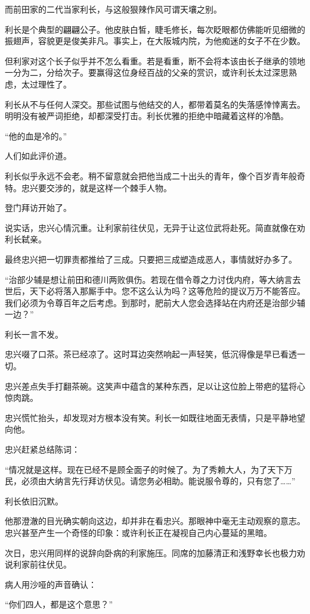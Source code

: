 \documentclass[
]{book}
\begin{document}
而前田家的二代当家利长，与这般狠辣作风可谓天壤之别。

利长是个典型的翩翩公子。他皮肤白皙，睫毛修长，每次眨眼都仿佛能听见细微的振翅声，容貌更是俊美非凡。事实上，在大阪城内院，为他痴迷的女子不在少数。

但利家对这个长子似乎并不怎么看重。若是看重，断不会将本该由长子继承的领地一分为二，分给次子。要赢得这位身经百战的父亲的赏识，或许利长太过深思熟虑，太过理性了。

利长从不与任何人深交。那些试图与他结交的人，都带着莫名的失落感悻悻离去。明明没有被严词拒绝，却都深受打击。利长优雅的拒绝中暗藏着这样的冷酷。

``他的血是冷的。''

人们如此评价道。

利长似乎永远不会老。稍不留意就会把他当成二十出头的青年，像个百岁青年般奇特。忠兴要交涉的，就是这样一个棘手人物。

登门拜访开始了。

说实话，忠兴心情沉重。让利家前往伏见，无异于让这位武将赴死。简直就像在劝利长弑亲。

最终忠兴把一切罪责都推给了三成。只要把三成塑造成恶人，事情就好办多了。

``治部少辅是想让前田和德川两败俱伤。若现在借令尊之力讨伐内府，等大纳言去世后，天下必将落入那厮手中。您不这么认为吗？这等危险的提议万万不能答应。我们必须为令尊百年之后考虑。到那时，肥前大人您会选择站在内府还是治部少辅一边？''

利长一言不发。

忠兴啜了口茶。茶已经凉了。这时耳边突然响起一声轻笑，低沉得像是早已看透一切。

忠兴差点失手打翻茶碗。这笑声中蕴含的某种东西，足以让这位脸上带疤的猛将心惊肉跳。

忠兴慌忙抬头，却发现对方根本没有笑。利长一如既往地面无表情，只是平静地望向他。

忠兴赶紧总结陈词：

``情况就是这样。现在已经不是顾全面子的时候了。为了秀赖大人，为了天下万民，必须由大纳言先行拜访伏见。请您务必相助。能说服令尊的，只有您了\ldots\ldots{}''

利长依旧沉默。

他那澄澈的目光确实朝向这边，却并非在看忠兴。那眼神中毫无主动观察的意志。忠兴甚至产生一个奇怪的印象：或许利长正在凝视自己内心蔓延的黑暗。

次日，忠兴用同样的说辞向卧病的利家施压。同席的加藤清正和浅野幸长也极力劝说利家前往伏见。

病人用沙哑的声音确认：

``你们四人，都是这个意思？''
\end{document}
